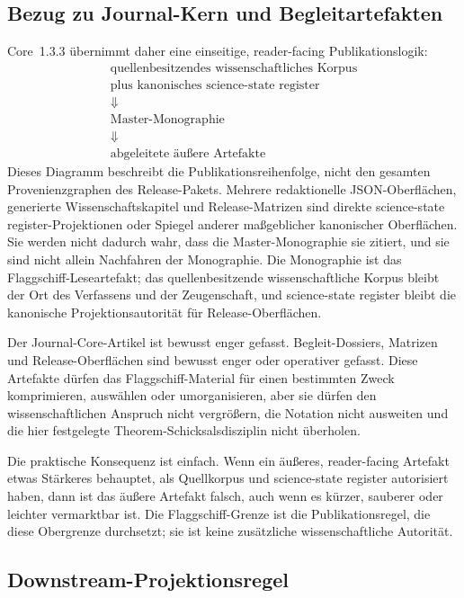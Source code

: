 \subsection{Bezug zu Journal-Kern und Begleitartefakten}

Core~1.3.3 übernimmt daher eine einseitige, reader-facing Publikationslogik:
\[
\begin{gathered}
\text{quellenbesitzendes wissenschaftliches Korpus}\\
\text{plus kanonisches science-state register}\\
\Downarrow\\
\text{Master-Monographie}\\
\Downarrow\\
\text{abgeleitete äußere Artefakte}
\end{gathered}
\]
Dieses Diagramm beschreibt die Publikationsreihenfolge, nicht den gesamten
Provenienzgraphen des Release-Pakets. Mehrere redaktionelle JSON-Oberflächen,
generierte Wissenschaftskapitel und Release-Matrizen sind direkte
science-state register-Projektionen oder Spiegel anderer maßgeblicher kanonischer Oberflächen.
Sie werden nicht dadurch wahr, dass die Master-Monographie sie zitiert, und
sie sind nicht allein Nachfahren der Monographie. Die Monographie ist das
Flaggschiff-Leseartefakt; das quellenbesitzende wissenschaftliche Korpus bleibt
der Ort des Verfassens und der Zeugenschaft, und science-state register bleibt die kanonische
Projektionsautorität für Release-Oberflächen.

Der Journal-Core-Artikel ist bewusst enger gefasst. Begleit-Dossiers,
Matrizen und Release-Oberflächen sind bewusst enger oder operativer gefasst.
Diese Artefakte dürfen das Flaggschiff-Material für einen bestimmten Zweck
komprimieren, auswählen oder umorganisieren, aber sie dürfen den
wissenschaftlichen Anspruch nicht vergrößern, die Notation nicht ausweiten und
die hier festgelegte Theorem-Schicksalsdisziplin nicht überholen.

Die praktische Konsequenz ist einfach. Wenn ein äußeres,
reader-facing Artefakt etwas Stärkeres behauptet, als Quellkorpus und science-state register
autorisiert haben, dann ist das äußere Artefakt falsch, auch wenn es kürzer,
sauberer oder leichter vermarktbar ist. Die Flaggschiff-Grenze ist die
Publikationsregel, die diese Obergrenze durchsetzt; sie ist keine zusätzliche
wissenschaftliche Autorität.

\subsection{Downstream-Projektionsregel}

